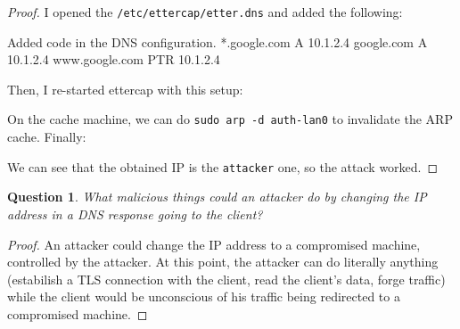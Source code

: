\documentclass[a4paper,11pt,hidelinks]{article}
\newtheorem{theorem}{Question}[subsection]
\begin{document}
\begin{proof}
I opened the \verb=/etc/ettercap/etter.dns= and added the following:

\begin{code}{Added code in the DNS configuration.}
    *.google.com A 10.1.2.4
    google.com A 10.1.2.4
    www.google.com PTR 10.1.2.4
\end{code}

Then, I re-started ettercap with this setup:


On the cache machine, we can do \verb=sudo arp -d auth-lan0= to invalidate the ARP cache. Finally:


We can see that the obtained IP is the \verb=attacker= one, so the attack worked.
\end{proof}

\begin{theorem}
    What malicious things could an attacker do by changing the IP address in a DNS response going to the client?
\end{theorem}

\begin{proof}
    An attacker could change the IP address to a compromised machine, controlled by the attacker. At this point, the attacker can do literally anything (estabilish a TLS connection with the client, read the client's data, forge traffic) while the client would be unconscious of his traffic being redirected to a compromised machine.
\end{proof}
\end{document}
